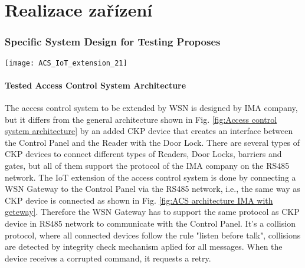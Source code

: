 \chapter{Realizace zařízení}



\subsection{Specific System Design for Testing Proposes}

\begin{figure*}[!h]
\centering
\texttt{[image: ACS\_IoT\_extension\_21]}
\caption{IMA access control system architecture with WSN extension}
    \label{fig:ACS architecture IMA with geteway}
\end{figure*}

\subsubsection{Tested Access Control System Architecture}
The access control system to be extended by WSN is designed by IMA company, but it differs from the general architecture shown in Fig. \ref{fig:Access control system architecture} by an added CKP device that creates an interface between the Control Panel and the Reader with the Door Lock.
There are several types of CKP devices to connect different types of Readers, Door Locks, barriers and gates, but all of them support the protocol of the IMA company on the RS485 network.
The IoT extension of the access control system is done by connecting a WSN Gateway to the Control Panel via the RS485 network, i.e., the same way as CKP device is connected as shown in Fig. \ref{fig:ACS architecture IMA with geteway}.
Therefore the WSN Gateway has to support the same protocol as CKP device in RS485 network to communicate with the Control Panel. It's a collision protocol, where all connected devices follow the rule "listen before talk", collisions are detected by integrity check mechanism aplied for all messages. When the device receives a corrupted command, it requests a retry.



